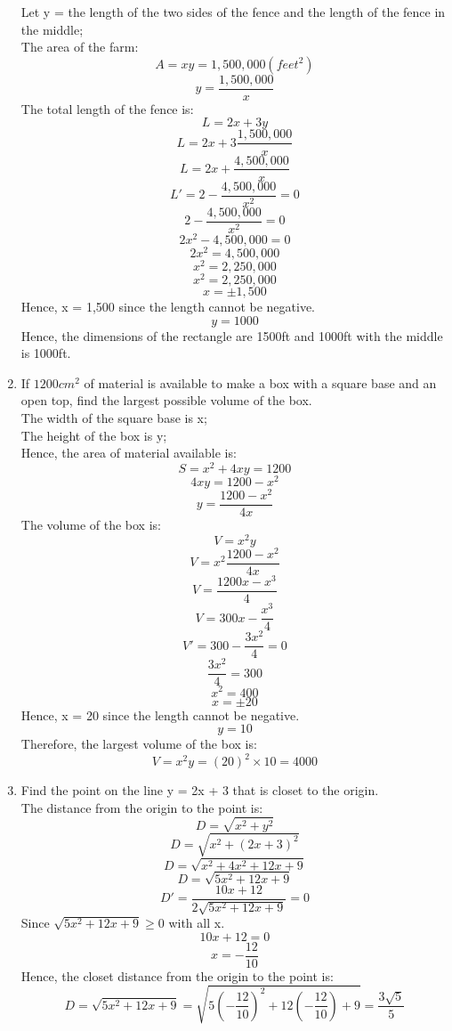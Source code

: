 \documentclass[12pt]{article}
\begin{document}
\begin{enumerate}
    Let y = the length of the two sides of the fence and the length of the fence in the middle;\\
    The area of the farm:
    \[A = xy = 1,500,000 (feet^2)\]
    \[y = \frac{1,500,000}{x}\]
    The total length of the fence is:
    \[L = 2x + 3y\]
    \[L = 2x + 3\frac{1,500,000}{x}\]
    \[L = 2x + \frac{4,500,000}{x}\]
    \[L' = 2 - \frac{4,500,000}{x^2} = 0\]
    \[2 - \frac{4,500,000}{x^2} = 0\]
    \[2x^2 - 4,500,000 = 0\]
    \[2x^2 = 4,500,000\]
    \[x^2 = 2,250,000\]
    \[x^2 = 2,250,000\]
    \[x = \pm 1,500\]
    Hence, x = 1,500 since the length cannot be negative.
    \[y = 1000\]
    Hence, the dimensions of the rectangle are 1500ft and 1000ft with the middle is 1000ft.
    \setcounter{enumi}{18}
    \item If $1200cm^2$ of material is available to make a box with a square base and an open top, find the largest possible volume of the box.\\
    The width of the square base is x;\\
    The height of the box is y;\\
    Hence, the area of material available is:
    \[S = x^2 + 4xy = 1200\]
    \[4xy = 1200 - x^2\]
    \[y = \frac{1200 - x^2}{4x}\]
    The volume of the box is:
    \[V = x^2y\]
    \[V = x^2\frac{1200 - x^2}{4x}\] 
    \[V = \frac{1200x - x^3}{4}\] 
    \[V = 300x - \frac{x^3}{4}\] 
    \[V' = 300 - \frac{3x^2}{4} = 0\] 
    \[\frac{3x^2}{4} = 300\]
    \[x^2 = 400\]
    \[x = \pm 20\]
    Hence, x = 20 since the length cannot be negative.
    \[y = 10\]
    Therefore, the largest volume of the box is:
    \[V = x^2y = (20)^2 \times 10 = 4000\]
    \setcounter{enumi}{24}
    \newpage
    \item Find the point on the line y = 2x + 3 that is closet to the origin.\\
    The distance from the origin to the point is:
    \[D = \sqrt{x^2 + y^2}\]
    \[D = \sqrt{x^2 + (2x+3)^2}\]
    \[D = \sqrt{x^2 + 4x^2 + 12x + 9}\]
    \[D = \sqrt{5x^2 + 12x + 9}\]
    \[D' = \frac{10x + 12}{2\sqrt{5x^2 + 12x + 9}} = 0\]
    Since $\sqrt{5x^2 + 12x + 9} \geq 0$ with all x.
    \[10x + 12 = 0\]
    \[x = -\frac{12}{10}\]
    Hence, the closet distance from the origin to the point is:
    \[D = \sqrt{5x^2 + 12x + 9} = \sqrt{5(-\frac{12}{10})^2 + 12(-\frac{12}{10}) + 9} = \frac{3\sqrt{5}}{5}\]

\end{enumerate}
\end{document}
